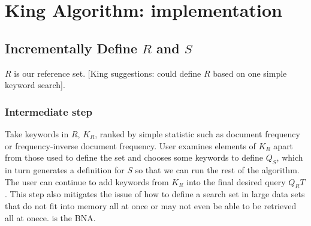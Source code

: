 \documentclass{article}\usepackage[]{graphicx}\usepackage[]{color}
\begin{document}
\section{King Algorithm: implementation}

\subsection{Incrementally Define $R$ and $S$}
$R$ is our reference set. [King suggestions: could define $R$ based on one simple keyword search].
\subsubsection{Intermediate step}
Take keywords in $R$, $K_R$, ranked by simple statistic such as document frequency or frequency-inverse document frequency. User examines elements of $K_R$ apart from those used to define the set and chooses some keywords to define $Q_S$, which in turn generates a definition for $S$ so that we can run the rest of the algorithm.
The user can continue to add keywords from $K_R$ into the final desired query $Q_RT$.
This step also mitigates the issue of how to define a search set in large data sets that do not fit into memory all at once or may not even be able to be retrieved all at onece. is the BNA.
\end{document}
